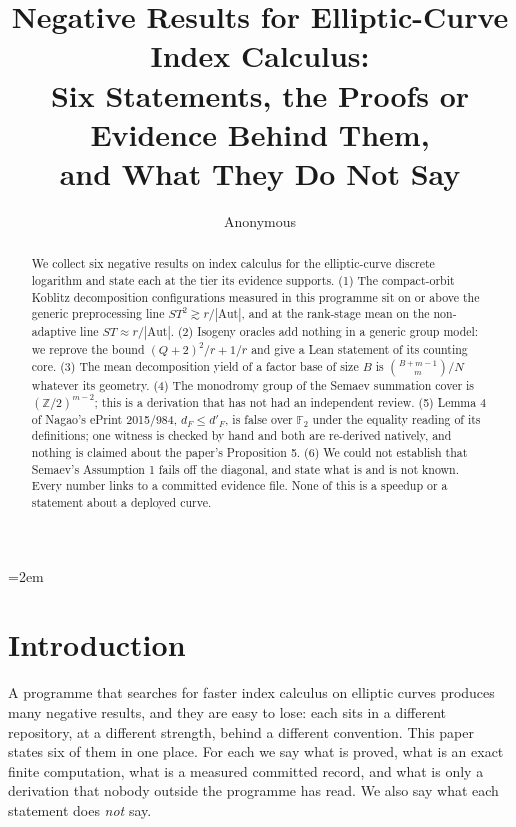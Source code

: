 \documentclass[10pt,a4paper]{article}
\title{Negative Results for Elliptic-Curve Index Calculus:\\
       Six Statements, the Proofs or Evidence Behind Them,\\
       and What They Do Not Say}
\author{Anonymous}
\date{}
\theoremstyle{definition}
\theoremstyle{remark}
\begin{document}
\maketitle
\emergencystretch=2em

\begin{abstract}
We collect six negative results on index calculus for the elliptic-curve
discrete logarithm and state each at the tier its evidence supports.
(1) The compact-orbit Koblitz decomposition configurations measured in this
programme sit on or above the generic preprocessing line
$ST^2 \gtrsim r/|\mathrm{Aut}|$, and at the rank-stage mean on the
non-adaptive line $ST \approx r/|\mathrm{Aut}|$.
(2) Isogeny oracles add nothing in a generic group model: we reprove the bound
$(Q+2)^2/r + 1/r$ and give a Lean statement of its counting core.
(3) The mean decomposition yield of a factor base of size $B$ is
$\binom{B+m-1}{m}/N$ whatever its geometry.
(4) The monodromy group of the Semaev summation cover is
$(\mathbb{Z}/2)^{m-2}$; this is a derivation that has not had an independent
review.
(5) Lemma 4 of Nagao's ePrint 2015/984, $d_F \le d'_F$, is false over
$\mathbb{F}_2$ under the equality reading of its definitions; one witness is
checked by hand and both are re-derived natively, and nothing is claimed about the
paper's Proposition 5.
(6) We could not establish that Semaev's Assumption 1 fails off the diagonal,
and state what is and is not known. Every number links to a committed
evidence file. None of this is a speedup or a statement about a deployed curve.
\end{abstract}

\section{Introduction}
\label{sec:intro}

A programme that searches for faster index calculus on elliptic curves
produces many negative results, and they are easy to lose: each sits in a
different repository, at a different strength, behind a different convention.
This paper states six of them in one place. For each we say what is proved, what
is an exact finite computation, what is a measured committed record, and what is
only a derivation that nobody outside the programme has read. We also say what
each statement does \emph{not} say.
\end{document}
